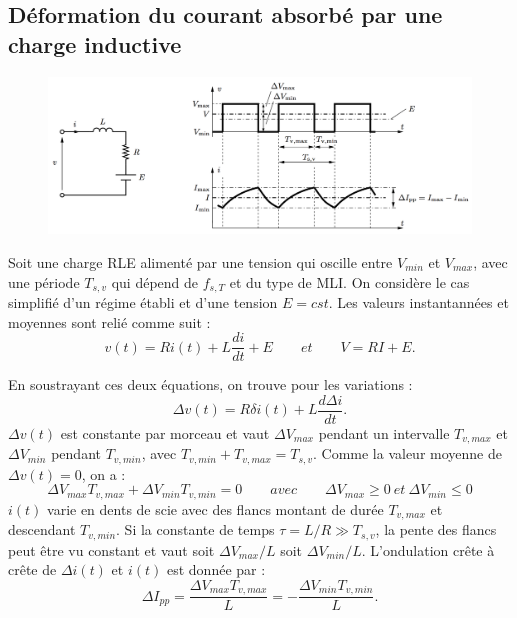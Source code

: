 	\subsection{Déformation du courant absorbé par une charge inductive}
		\begin{figure}
		\vspace{-5mm}
		\includegraphics[scale=0.25]{ch4/14}
		\end{figure}
		Soit une charge RLE alimenté par une tension qui oscille entre $V_{min}$ et $V_{max}$, avec une période $T_{s,v}$ qui dépend de $f_{s,T}$ et du type de MLI. On considère le cas simplifié d'un régime établi et d'une tension $E=cst$. Les valeurs instantannées et moyennes sont relié comme suit :\\
		\begin{equation}
			v(t) = Ri(t) + L\frac{di}{dt} + E \qquad et \qquad V = RI + E.
		\end{equation}
		
		En soustrayant ces deux équations, on trouve pour les variations :
		\begin{equation}
			\Delta v(t) = R\delta i(t) + L\frac{d\Delta i}{dt}.
		\end{equation}
		$\Delta v(t)$ est constante par morceau et vaut $\Delta V_{max}$ pendant un intervalle $T_{v,max}$ et $\Delta V_{min}$ pendant $T_{v,min}$, avec $T_{v,min} + T_{v,max} = T_{s,v}$. Comme la valeur moyenne de $\Delta v(t) = 0$, on a :
		\begin{equation}
			\Delta V_{max}T_{v,max} + \Delta V_{min}T_{v,min} = 0 \qquad avec \qquad \Delta V_{max} \geq 0 \ et \ \Delta V_{min} \leq 0
		\end{equation}
		$i(t)$ varie en dents de scie avec des flancs montant de durée $T_{v,max}$ et descendant $T_{v,min}$. Si la constante de temps $\tau = L/R \gg T_{s,v}$, la pente des flancs peut être vu constant et vaut soit $\Delta V_{max}/L$ soit $\Delta V_{min}/L$. L'ondulation crête à crête de $\Delta i(t)$ et $i(t)$ est donnée par :
		\begin{equation}
			\Delta I_{pp} = \frac{\Delta V_{max}T_{v,max}}{L} = -\frac{\Delta V_{min}T_{v,min}}{L}.
		\end{equation}
		

